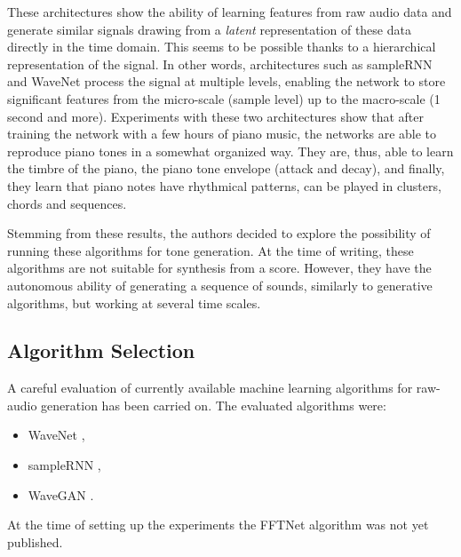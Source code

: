 These architectures show the ability of learning features from raw audio data and generate similar signals drawing from a \textit{latent} representation of these data directly in the time domain. This seems to be possible thanks to a hierarchical representation of the signal. In other words, architectures such as sampleRNN and WaveNet process the signal at multiple levels, enabling the network to store significant features from the micro-scale (sample level) up to the macro-scale (1 second and more). Experiments with these two architectures show that after training the network with a few hours of piano music, the networks are able to reproduce piano tones in a somewhat organized way. They are, thus, able to learn the timbre of the piano, the piano tone envelope (attack and decay), and finally, they learn that piano notes have rhythmical patterns, can be played in clusters, chords and sequences.

Stemming from these results, the authors decided to explore the possibility of running these algorithms for tone generation. At the time of writing, these algorithms are not suitable for synthesis from a score. However, they have the autonomous ability of generating a sequence of sounds, similarly to generative algorithms, but working at several time scales.

\subsection{Algorithm Selection}\label{subsec:algorithm}

A careful evaluation of currently available machine learning algorithms for raw-audio generation has been carried on. The evaluated algorithms were:
\begin{itemize}
	\item WaveNet \cite{van2016wavenet},
	\item sampleRNN \cite{mehri2016samplernn},
	\item WaveGAN \cite{donahue2018synthesizing}.
\end{itemize}

At the time of setting up the experiments the FFTNet algorithm \cite{jin2018fftnet} was not yet published.

